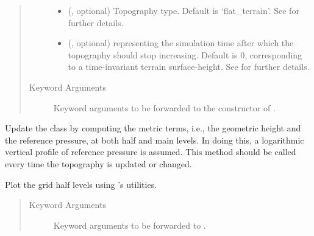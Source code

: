 \documentclass[letterpaper,10pt,english]{sphinxmanual}
\begin{document}
\begin{fulllineitems}
\begin{fulllineitems}
\begin{quote}
\begin{description}
\begin{itemize}
\item {} 
 (, optional) \textendash{} Topography type. Default is ‘flat\_terrain’. See {\hyperref[\detokenize{api:module-grids.topography}]{}} for further details.

\item {} 
 (, optional) \textendash{}  representing the simulation time after which the topography should stop increasing.
Default is 0, corresponding to a time-invariant terrain surface-height. See {\hyperref[\detokenize{api:module-grids.topography}]{}} for further
details.

\end{itemize}

\item[{Keyword Arguments}] \leavevmode
{} \textendash{} Keyword arguments to be forwarded to the constructor of {\hyperref[\detokenize{api:grids.topography.Topography1d}]{}}.

\end{description}\end{quote}

\end{fulllineitems}


\begin{fulllineitems}
\label{\detokenize{api:grids.gal_chen.GalChen2d._update_metric_terms}}
Update the class by computing the metric terms, i.e., the geometric height and the reference pressure,
at both half and main levels. In doing this, a logarithmic vertical profile of reference pressure is assumed.
This method should be called every time the topography is updated or changed.

\end{fulllineitems}


\begin{fulllineitems}
\label{\detokenize{api:grids.gal_chen.GalChen2d.plot}}
Plot the grid half levels using ’s utilities.
\begin{quote}\begin{description}
\item[{Keyword Arguments}] \leavevmode
{} \textendash{} Keyword arguments to be forwarded to .


\end{description}
\end{quote}
\end{fulllineitems}
\end{fulllineitems}
\end{document}
